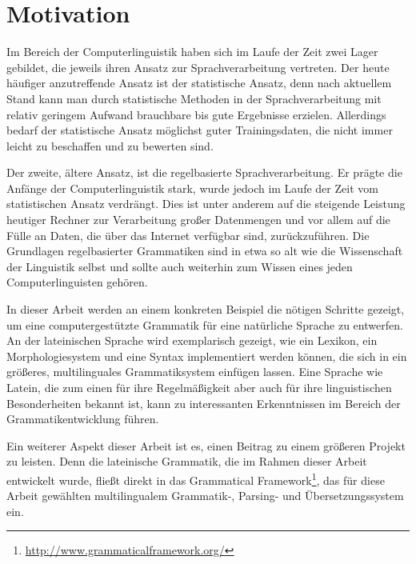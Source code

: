 \section{Motivation}
\label{sec:motivation}
Im Bereich der Computerlinguistik haben sich im Laufe der Zeit zwei Lager gebildet, die jeweils ihren Ansatz zur Sprachverarbeitung vertreten. Der heute häufiger anzutreffende Ansatz ist der statistische Ansatz, denn nach aktuellem Stand kann man durch statistische Methoden in der Sprachverarbeitung mit relativ geringem Aufwand brauchbare bis gute Ergebnisse erzielen. Allerdings bedarf der statistische Ansatz möglichst guter Trainingsdaten, die nicht immer leicht zu beschaffen und zu bewerten sind. \par
Der zweite, ältere Ansatz, ist die regelbasierte Sprachverarbeitung. Er prägte die Anfänge der Computerlinguistik stark, wurde jedoch im Laufe der Zeit vom statistischen Ansatz verdrängt. Dies ist unter anderem auf die steigende Leistung heutiger Rechner zur Verarbeitung großer Datenmengen und vor allem auf die Fülle an Daten, die über das Internet verfügbar sind, zurückzuführen. Die Grundlagen regelbasierter Grammatiken sind in etwa so alt wie die Wissenschaft der Linguistik selbst und sollte auch weiterhin zum Wissen eines jeden Computerlinguisten gehören. \par
In dieser Arbeit werden an einem konkreten Beispiel die nötigen Schritte gezeigt, um eine computergestützte Grammatik für eine natürliche Sprache zu entwerfen. An der lateinischen Sprache wird exemplarisch gezeigt, wie ein Lexikon, ein Morphologiesystem und eine Syntax implementiert werden können, die sich in ein größeres, multilinguales Grammatiksystem einfügen lassen. Eine Sprache wie Latein, die zum einen für ihre Regelmäßigkeit aber auch für ihre linguistischen Besonderheiten bekannt ist, kann zu interessanten Erkenntnissen im Bereich der Grammatikentwicklung führen. \par
Ein weiterer Aspekt dieser Arbeit ist es, einen Beitrag zu einem größeren Projekt zu leisten. Denn die lateinische Grammatik, die im Rahmen dieser Arbeit entwickelt wurde, fließt direkt in das Grammatical Framework\footnote{\url{http://www.grammaticalframework.org/}}, das für diese Arbeit gewählten multilingualem Grammatik-, Parsing- und Übersetzungssystem ein.
\pagebreak
